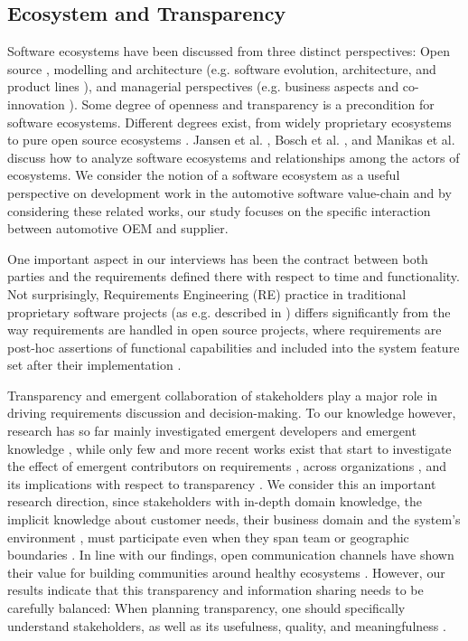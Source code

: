 \subsection{Ecosystem and Transparency}
Software ecosystems have been discussed from three distinct perspectives: Open source
\cite{Scacchi2009}, modelling and architecture (e.g. software evolution, architecture, and product lines \cite{Bosch2009}), and managerial perspectives (e.g. business aspects and co-innovation \cite{Jansen2012b}). 
Some degree of openness and transparency is a precondition for software ecosystems. Different degrees exist, from widely proprietary ecosystems to pure open source ecosystems \cite{Angeren2012,Jansen2012c}.
Jansen et al. \cite{Jansen2012a}, Bosch et al. \cite{Bosch2009}, and Manikas et al. \cite{Manikas2013b} discuss how to analyze software ecosystems and relationships among the actors of ecosystems. 
We consider the notion of a software ecosystem as a useful perspective on development work in the automotive software value-chain \cite{Knauss2014d} and by considering these related works, our study focuses on the specific interaction between automotive OEM and supplier.

One important aspect in our interviews has been the contract between both parties and the requirements defined there with respect to time and functionality. 
Not surprisingly, Requirements Engineering (RE) practice in traditional proprietary software projects (as e.g. described in \cite{Robertson1999,Ruhe2010}) differs significantly from the way requirements are handled in open source projects, where requirements are post-hoc assertions of functional capabilities and included into the system feature set after their implementation \cite{Scacchi2009}.


Transparency and emergent collaboration of stakeholders play a major role in driving requirements discussion and decision-making.
To our knowledge however, research has so far mainly investigated emergent developers \cite{Minto2007,Haenni2014,Sadi2015} and emergent knowledge \cite{Treude2012}, while only few and more recent works exist that start to investigate the effect of emergent contributors on requirements \cite{Kwan2011}, across organizations \cite{Linaker2016,KYB+2016}, and its implications with respect to transparency \cite{Dabbish2013,Hosseini2016}. 
We consider this an important research direction, since stakeholders with in-depth domain knowledge, the implicit knowledge about customer needs, their business domain and the system’s environment \cite{Damian2013}, must participate even when they span team or geographic boundaries \cite{boden2009bridging}.
In line with our findings, open communication channels have shown their value for building communities around healthy ecosystems  \cite{Kilamo2012}.
However, our results indicate that this transparency and information sharing needs to be carefully balanced: When planning transparency, one should specifically understand stakeholders, %
as well as its usefulness, quality, and meaningfulness \cite{Hosseini2016}.